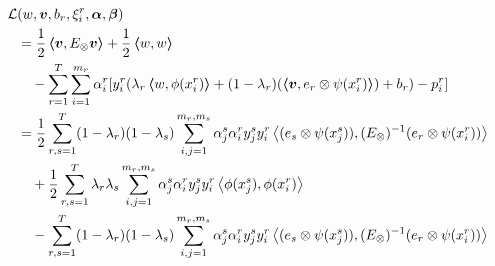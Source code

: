 \begin{equation}\nonumber
    \begin{aligned}
        \mathcal{L} & ({w}, \fv{v}, b_r, \xi_i^r, {\fv{\alpha}}, \fv{\beta})                                                                                                                                                                       \\
                    & = \frac{1}{2} \dotp{\fv{v}}{E_\otimes \fv{v}} + \frac{1}{2} \dotp{w}{w}
        \\ &\quad  - \sum_{r=1}^T \sum_{i=1}^{\npertask_r}{ \alpha_i^r [y_{i}^r (\lambda_r \dotp{w}{\phi(x_i^r)} + (1 - \lambda_r) (\dotp{\fv{v}}{e_r \otimes \psi({x}_i^r)}) + b_r) - p_{i}^r]   } \\
                    & = \frac{1}{2} \sum_{r, s=1}^\ntasks (1-\lambda_r)(1-\lambda_s) \sum_{i, j=1}^{\npertask_r, \npertask_s} \alpha_j^s \alpha_i^r y_j^s y_i^r \dotp{(e_s \otimes \psi(x_j^s))}{(E_\otimes)^{-1} (e_r \otimes \psi(x_i^r))}       \\
                    & \quad +\frac{1}{2} \sum_{r,s=1}^\ntasks \lambda_r \lambda_s \sum_{i, j=1}^{\npertask_r, \npertask_s} \alpha_j^s \alpha_i^r y_j^s y_i^r \dotp{\phi(x_j^s)}{\phi(x_i^r)}                                                       \\
                    & \quad - \sum_{r, s=1}^\ntasks (1-\lambda_r)(1-\lambda_s) \sum_{i, j=1}^{\npertask_r, \npertask_s} \alpha_j^s \alpha_i^r y_j^s y_i^r \dotp{(e_s \otimes \psi(x_j^s))}{(E_\otimes)^{-1} (e_r \otimes \psi(x_i^r))}             \\

\end{aligned}
\end{equation}
